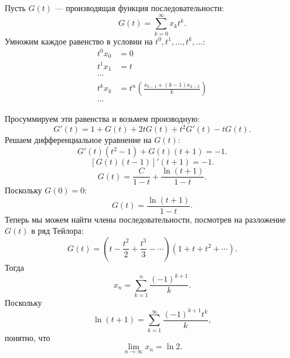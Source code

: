 \documentclass{article}
\begin{document}
Пусть $G(t)$ --- производящая функция последовательности:
$$G(t) = \sum_{k=0}^\infty x_k t^k.$$
Умножим каждое равенство в условии на $t^0, t^1, \ldots, t^k, \ldots$:
\begin{align*}    
t^0 x_0 &= 0\\
t^1 x_1 &= t\\
\cdots&\\
t^k x_k &= t^n \left( \frac{x_{k-1} + (k-1)x_{k-2}}{k} \right)\\
\cdots&
\end{align*}

Просуммируем эти равенства и возьмем производную:
$$G'(t) = 1 + G(t) + 2tG(t) + t^2G'(t) - tG(t).$$
Решаем дифференциальное уравнение на $G(t)$:
$$G'(t)(t^2 - 1) + G(t)(t+1) = -1.$$
$$[G(t)(t-1)]'(t+1) = -1.$$
$$G(t) = \frac{C}{1-t} + \frac{\ln (t+1)}{1-t}.$$
Поскольку $G(0) = 0$:
$$G(t) = \frac{\ln (t+1)}{1-t}.$$
Теперь мы можем найти члены последовательности, посмотрев на разложение $G(t)$ в ряд Тейлора:
$$G(t) = (t - \frac{t^2}{2} + \frac{t^3}{3} - \cdots)(1 + t + t^2 + \cdots).$$
Тогда
$$x_n = \sum_{k=1}^n \frac{(-1)^{k+1}}{k}.$$
Поскольку 
$$\ln(t + 1) = \sum_{k=1}^\infty \frac{(-1)^{k+1}t^k}{k},$$
понятно, что
$$\lim_{n \to \infty} x_n = \ln 2.$$
\end{document}
